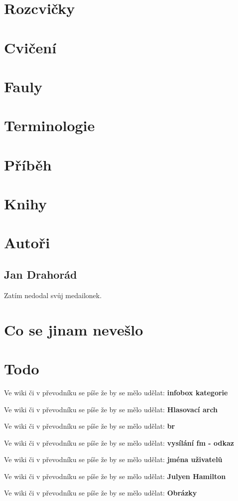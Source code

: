 \documentclass[a4paper,8pt,openany]{memoir}
\newcommand{\todo}[1]{

Ve wiki či v převodníku se píše že by se mělo udělat: \textbf{#1} 

}
\begin{document}
\chapter{Rozcvičky}\label{rozcvičky}


\chapter{Cvičení}\label{cvičení}


\chapter{Fauly}\label{fauly}


\chapter{Terminologie}\label{terminologie}



\chapter{Příběh}\label{příběh}



\chapter{Knihy}\label{knihy}



\chapter{Autoři}\label{autori}
\section{Jan Drahorád}
Zatím nedodal svůj medailonek.



\chapter{Co se jinam nevešlo}\label{co se jinam nevešlo}

\chapter{Todo}
\todo{infobox kategorie}
\todo{Hlasovací arch}
\todo{br}
\todo{vysílání fm - odkaz}
\todo{jména uživatelů}
\todo{Julyen Hamilton}
\todo{Obrázky}
\setcounter{tocdepth}{1}
\tableofcontents
\end{document}
